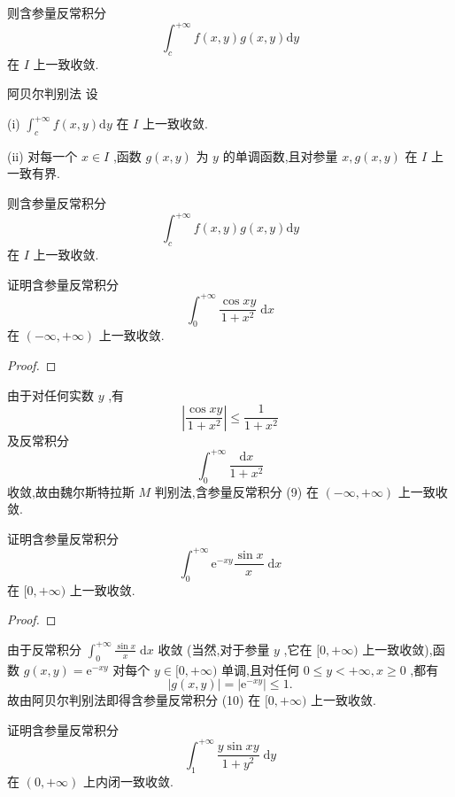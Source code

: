 则含参量反常积分
\[
{\int }_{c}^{+\infty }f\left( {x,y}\right) g\left( {x,y}\right) \mathrm{d}y
\]
在 \(I\) 上一致收敛.

阿贝尔判别法 设

(i) \({\int }_{c}^{+\infty }f\left( {x,y}\right) \mathrm{d}y\) 在 \(I\) 上一致收敛.

(ii) 对每一个 \(x \in  I\) ,函数 \(g\left( {x,y}\right)\) 为 \(y\) 的单调函数,且对参量 \(x,g\left( {x,y}\right)\) 在 \(I\) 上一致有界.

则含参量反常积分
\[
{\int }_{c}^{+\infty }f\left( {x,y}\right) g\left( {x,y}\right) \mathrm{d}y
\]
在 \(I\) 上一致收敛.

\begin{example}

\end{example}
证明含参量反常积分
\[
{\int }_{0}^{+\infty }\frac{\cos {xy}}{1 + {x}^{2}}\mathrm{\;d}x \tag{9}
\]
在 \(\left( {-\infty , + \infty }\right)\) 上一致收敛.

\begin{proof}

\end{proof}
由于对任何实数 \(y\) ,有
\[
\left| \frac{\cos {xy}}{1 + {x}^{2}}\right|  \leq  \frac{1}{1 + {x}^{2}}
\]
及反常积分
\[
{\int }_{0}^{+\infty }\frac{\mathrm{d}x}{1 + {x}^{2}}
\]
收敛,故由魏尔斯特拉斯 \(M\) 判别法,含参量反常积分 (9) 在 \(\left( {-\infty , + \infty }\right)\) 上一致收敛.

\begin{example}

\end{example}
证明含参量反常积分
\[
{\int }_{0}^{+\infty }{\mathrm{e}}^{-{xy}}\frac{\sin x}{x}\mathrm{\;d}x \tag{10}
\]
在 \(\lbrack 0, + \infty )\) 上一致收敛.

\begin{proof}

\end{proof}
由于反常积分 \({\int }_{0}^{+\infty }\frac{\sin x}{x}\mathrm{\;d}x\) 收敛 (当然,对于参量 \(y\) ,它在 \(\lbrack 0, + \infty )\) 上一致收敛),函数 \(g\left( {x,y}\right)  = {\mathrm{e}}^{-{xy}}\) 对每个 \(y \in  \lbrack 0, + \infty )\) 单调,且对任何 \(0 \leq  y <  + \infty ,x \geq  0\) ,都有
\[
\left| {g\left( {x,y}\right) }\right|  = \left| {\mathrm{e}}^{-{xy}}\right|  \leq  1.
\]
故由阿贝尔判别法即得含参量反常积分 (10) 在 \(\lbrack 0, + \infty )\) 上一致收敛.

\begin{example}

\end{example}
证明含参量反常积分
\[
{\int }_{1}^{+\infty }\frac{y\sin {xy}}{1 + {y}^{2}}\mathrm{\;d}y \tag{11}
\]
在 \(\left( {0, + \infty }\right)\) 上内闭一致收敛.

